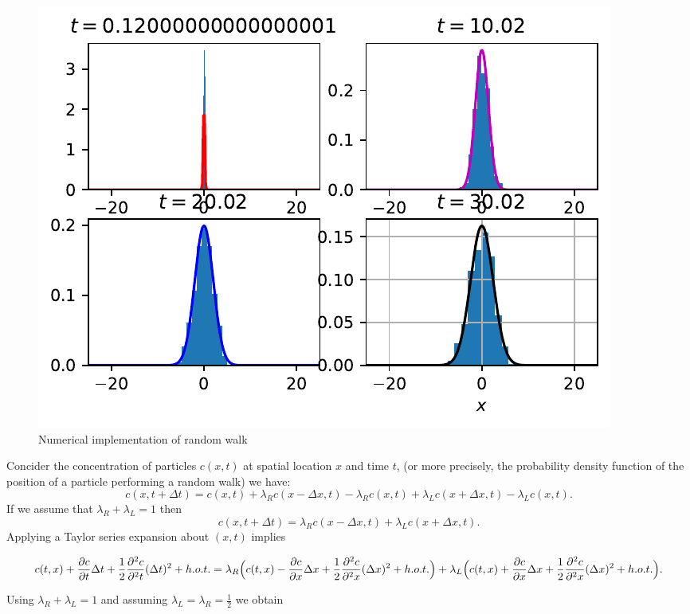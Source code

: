 \documentclass[
  letterpaper,
  DIV=11,
  numbers=noendperiod]{scrreprt}
\theoremstyle{plain}
\theoremstyle{definition}
\theoremstyle{plain}
\theoremstyle{remark}
\begin{document}
\begin{figure}[H]

{\centering \includegraphics{linearreactiondiffusion_files/figure-pdf/fig-randomwalksim-output-1.pdf}

}

\caption{\label{fig-randomwalksim}Numerical implementation of random
walk}

\end{figure}

Concider the concentration of particles \(c(x,t)\) at spatial location
\(x\) and time \(t\), (or more precisely, the probability density
function of the position of a particle performing a random walk) we
have: \[
c(x, t+ \Delta t) = c(x, t)  + \lambda_R c(x- \Delta x, t) - \lambda_R c(x, t) + \lambda_L c(x+ \Delta x, t) - \lambda_L c (x,t).
\] If we assume that \(\lambda_R+ \lambda_L =1\) then \[
c(x, t+ \Delta t) =  \lambda_R c(x- \Delta x, t) + \lambda_L c(x+ \Delta x, t).
\] Applying a Taylor series expansion about \((x,t)\) implies

\[
c(t,x) + \frac{ \partial c}{\partial t} \Delta t + \frac 12  \frac{ \partial^2 c}{\partial^2 t} (\Delta t )^2  + h.o.t. =
\lambda_R \Big( c(t,x) - \frac{ \partial c}{\partial x} \Delta x + \frac 12  \frac{ \partial^2 c}{\partial^2 x} (\Delta x )^2  + h.o.t. \Big)\\ +
\lambda_L \Big( c(t,x) + \frac{ \partial c}{\partial x} \Delta x + \frac 12  \frac{ \partial^2 c}{\partial^2 x} (\Delta x )^2  + h.o.t. \Big).
\]

Using \(\lambda_R+ \lambda_L =1\) and assuming
\(\lambda_L = \lambda_R = \frac 12\) we obtain
\end{document}
